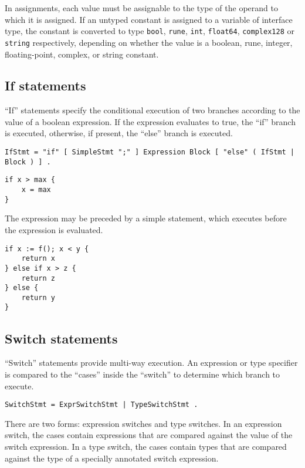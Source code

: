 In assignments, each value must be assignable
to the type of the operand to which it is assigned. If an untyped
constant is assigned to a variable of interface
type, the constant is converted to type
\texttt{bool}, \texttt{rune}, \texttt{int}, \texttt{float64},
\texttt{complex128} or \texttt{string} respectively, depending on
whether the value is a boolean, rune, integer, floating-point, complex,
or string constant.

\subsection*{If statements}

``If'' statements specify the conditional execution of two branches
according to the value of a boolean expression. If the expression
evaluates to true, the ``if'' branch is executed, otherwise, if present,
the ``else'' branch is executed.

\begin{Verbatim}[frame=single]
IfStmt = "if" [ SimpleStmt ";" ] Expression Block [ "else" ( IfStmt | Block ) ] .
\end{Verbatim}

\begin{Verbatim}[frame=single]
if x > max {
    x = max
}
\end{Verbatim}

The expression may be preceded by a simple statement, which executes
before the expression is evaluated.

\begin{Verbatim}[frame=single]
if x := f(); x < y {
    return x
} else if x > z {
    return z
} else {
    return y
}
\end{Verbatim}

\subsection*{Switch statements}

``Switch'' statements provide multi-way execution. An expression or type
specifier is compared to the ``cases'' inside the ``switch'' to
determine which branch to execute.

\begin{Verbatim}[frame=single]
SwitchStmt = ExprSwitchStmt | TypeSwitchStmt .
\end{Verbatim}

There are two forms: expression switches and type switches. In an
expression switch, the cases contain expressions that are compared
against the value of the switch expression. In a type switch, the cases
contain types that are compared against the type of a specially
annotated switch expression.

